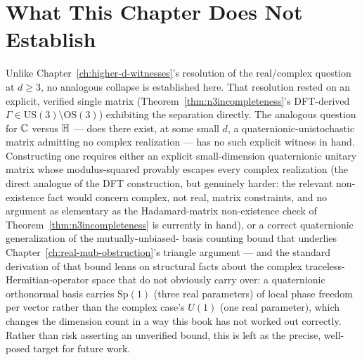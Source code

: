 \section{What This Chapter Does Not Establish}

Unlike Chapter~\ref{ch:higher-d-witnesses}'s resolution of the real/complex
question at $d\ge3$, no analogous collapse is established here. That
resolution rested on an explicit, verified single matrix
(Theorem~\ref{thm:n3incompleteness}'s DFT-derived $\Gamma \in
\mathrm{US}(3)\setminus\mathrm{OS}(3)$) exhibiting the separation directly.
The analogous question for $\mathbb{C}$ versus $\mathbb{H}$ — does there exist, at some
small $d$, a quaternionic-unistochastic matrix admitting no complex
realization — has no such explicit witness in hand. Constructing one
requires either an explicit small-dimension quaternionic unitary matrix
whose modulus-squared provably escapes every complex realization (the
direct analogue of the DFT construction, but genuinely harder: the
relevant non-existence fact would concern complex, not real, matrix
constraints, and no argument as elementary as the Hadamard-matrix
non-existence check of Theorem~\ref{thm:n3incompleteness} is currently in
hand), or a correct quaternionic generalization of the mutually-unbiased-
basis counting bound that underlies Chapter~\ref{ch:real-mub-obstruction}'s
triangle argument — and the standard derivation of that bound leans on
structural facts about the complex traceless-Hermitian-operator space that
do not obviously carry over: a quaternionic orthonormal basis carries
$\mathrm{Sp}(1)$ (three real parameters) of local phase freedom per vector
rather than the complex case's $U(1)$ (one real parameter), which changes
the dimension count in a way this book has not worked out correctly.
Rather than risk asserting an unverified bound, this is left as the
precise, well-posed target for future work.

